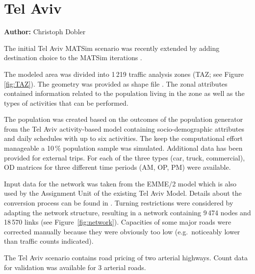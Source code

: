 \section{Tel Aviv}
\label{sec:scenario.telaviv}
\hfill \textbf{Author:} Christoph Dobler


The initial Tel Aviv MATSim scenario \citep[][]{BekhorEtAl_TRB_2011} was recently extended by adding destination choice to the MATSim iterations \citep[][]{DoblerEtAl_TechRep_IVT_2014}.

The modeled area was divided into 1\,219 traffic analysis zones (TAZ; see Figure \ref{fig:TAZ}). The geometry was provided as shape file \citep{ESRI-ShapeFile_manual_1998}. The zonal attributes contained information related to the population living in the zone as well as the types of activities that can be performed.

The population was created based on the outcomes of the population generator from the Tel Aviv activity-based model containing socio-demographic attributes and daily schedules with up to six activities. The keep the computational effort manageable a 10\,\% population sample was simulated. Additional data has been provided for external trips. For each of the three types (car, truck, commercial), OD matrices for three different time periods (AM, OP, PM) were available.

Input data for the network was taken from the EMME/2 model \citep[see][]{EMME_Webpage_2011} which is also used by the Assignment Unit of the existing Tel Aviv Model. Details about the conversion process can be found in \citet{GaoWEtAl_TRR_2010}. Turning restrictions were considered by adapting the network structure, resulting in a network containing 9\,474 nodes and 18\,570 links (see Figure~\ref{fig:network}). Capacities of some major roads were corrected manually because they were obviously too low (e.g.\ noticeably lower than traffic counts indicated).

The Tel Aviv scenario contains road pricing of two arterial highways. Count data for validation was available for 3 arterial roads.

